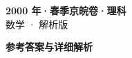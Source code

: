 \documentclass[zihao=-4, a4paper]{ctexart}
\begin{document}
\begin{center}
  {\Large\bfseries 2000 年·春季京皖卷·理科}\\[4pt]
  {\large 数学 · 解析版}
\end{center}
\medskip
{}

\clearpage
{}
\begin{center}{\Large\bfseries 参考答案与详细解析}\end{center}
\medskip

\end{document}
